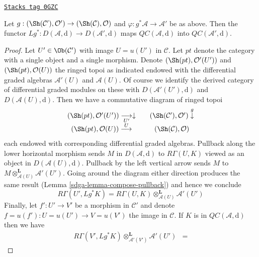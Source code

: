 \begin{lemma}
\label{sdga-lemma-cartesian-functorial}
\href{https://stacks.math.columbia.edu/tag/0GZC}{\texttt{Stacks tag 0GZC}}

Let $g : (\Sh(\mathcal{C}'), \mathcal{O}') \to (\Sh(\mathcal{C}), \mathcal{O})$
and $\varphi : g^*\mathcal{A} \to \mathcal{A}'$
be as above. Then the functor
$Lg^* : D(\mathcal{A}, \text{d}) \to D(\mathcal{A}', \text{d})$
maps $\mathit{QC}(\mathcal{A}, \text{d})$ into
$\mathit{QC}(\mathcal{A}', \text{d})$.
\end{lemma}

\begin{proof}

Let $U' \in \Ob(\mathcal{C}')$ with image $U = u(U')$ in $\mathcal{C}$.
Let $pt$ denote the category with a single object and a single morphism.
Denote $(\Sh(pt), \mathcal{O}'(U'))$ and $(\Sh(pt), \mathcal{O}(U))$
the ringed topoi as indicated endowed with the differential graded
algebras $\mathcal{A}'(U)$ and $\mathcal{A}(U)$.
Of course we identify the derived category of differential graded modules
on these with $D(\mathcal{A}'(U'), \text{d})$ and
$D(\mathcal{A}(U), \text{d})$.
Then we have a commutative diagram of ringed topoi
$$
\begin{array}{ccc}(\Sh(pt), \mathcal{O}'(U')) \underset{U'}{\longrightarrow}\downarrow &  & (\Sh(\mathcal{C}'), \mathcal{O}') \overset{g}{\downarrow} \\ (\Sh(pt), \mathcal{O}(U)) \overset{U}{\longrightarrow} &  & (\Sh(\mathcal{C}), \mathcal{O})\end{array}
$$
each endowed with corresponding differential graded algebras.
Pullback along the lower horizontal morphism sends $M$ in
$D(\mathcal{A}, \text{d})$ to $R\Gamma(U, K)$ viewed as an
object in $D(\mathcal{A}(U), \text{d})$.
Pullback by the left vertical arrow sends $M$ to
$M \otimes_{\mathcal{A}(U)}^\mathbf{L} \mathcal{A}'(U')$.
Going around the diagram either direction produces the same result
(Lemma \ref{sdga-lemma-compose-pullback}) and hence we conclude
$$
R\Gamma(U', Lg^*K) =
R\Gamma(U, K) \otimes_{\mathcal{A}(U)}^\mathbf{L} \mathcal{A}'(U')
$$
Finally, let $f' : U' \to V'$ be a morphism in $\mathcal{C}'$ and
denote $f = u(f') : U = u(U') \to V = u(V')$ the image in $\mathcal{C}$.
If $K$ is in $\mathit{QC}(\mathcal{A}, \text{d})$ then we have
\begin{align*}
R\Gamma(V', Lg^*K) \otimes_{\mathcal{A}'(V')}^\mathbf{L} \mathcal{A}'(U')
& =

\end{align*}
\end{proof}
